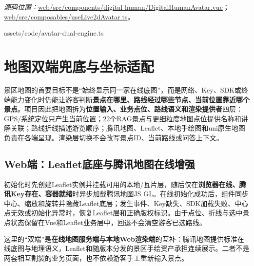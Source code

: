 \newpage
\noindent\textit{源码位置：}\url{web/src/components/digital-human/DigitalHumanAvatar.vue}；\url{web/src/composables/useLive2dAvatar.ts}。

  {assets/code/avatar-dual-engine.ts}

\newpage
\section{地图双端兜底与坐标适配}

景区地图的首要目标不是“始终显示同一家在线底图”，而是网络、Key、SDK或终端能力变化时仍能让游客判断\textbf{景点在哪里、路线经过哪些节点、当前位置靠近哪个景点}。项目因此把地图拆为\textbf{位置输入、业务点位、路线语义和渲染提供者}四层：GPS/系统定位只产生当前位置；22个RAG景点与更细粒度地图点位提供名称和讲解关联；路线折线描述游览顺序；腾讯地图、Leaflet、本地手绘图和uni原生地图负责在各端呈现。渲染层切换不会改写景点ID、当前路线或问答上下文。

\subsection{Web端：Leaflet底座与腾讯地图在线增强}

初始化时先创建Leaflet实例并挂载可用的本地/瓦片层，随后仅在\textbf{浏览器在线、腾讯Key存在、容器就绪}时异步加载腾讯地图JS GL。在线初始化成功后，组件同步中心、缩放和旋转并隐藏Leaflet底层；发生事件、Key缺失、SDK加载失败、中心点无效或初始化异常时，恢复Leaflet层和正确版权标识。由于点位、折线与选中景点状态保留在Vue和Leaflet业务层中，回退不会清空游客已选路线。

这里的“双端”是\textbf{在线地图服务端与本地Web渲染端}的互补：腾讯地图提供标准在线底图与地理语义，Leaflet和随版本分发的景区手绘资产承担连续展示。二者不是两套相互割裂的业务页面，也不依赖游客手工重新输入景点。

